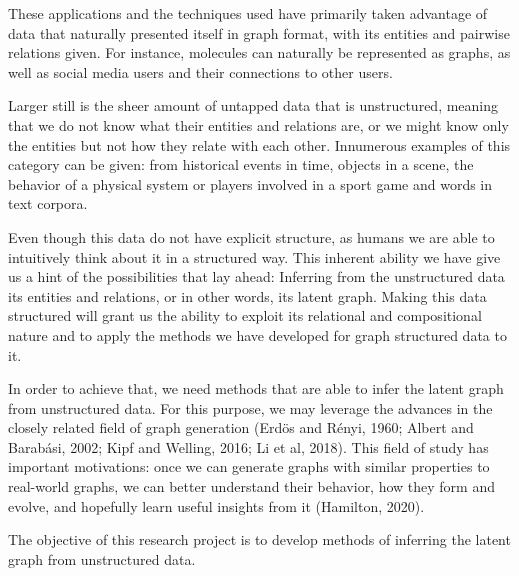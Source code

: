 These applications and the techniques used have primarily taken advantage of data that naturally presented itself in graph format, with its entities and pairwise relations given. For instance, molecules can naturally be represented as graphs, as well as social media users and their connections to other users.

Larger still is the sheer amount of untapped data that is unstructured, meaning that we do not know what their entities and relations are, or we might know only the entities but not how they relate with each other. Innumerous examples of this category can be given: from historical events in time, objects in a scene, the behavior of a physical system or players involved in a sport game and words in text corpora. 

Even though this data do not have explicit structure, as humans we are able to intuitively think about it in a structured way. This inherent ability we have give us a hint of the possibilities that lay ahead: Inferring from the unstructured data its entities and relations, or in other words, its latent graph. Making this data structured will grant us the ability to exploit its relational and compositional nature and to apply the methods we have developed for graph structured data to it.

In order to achieve that, we need methods that are able to infer the latent graph from unstructured data. For this purpose, we may leverage the advances in the closely related field of graph generation (Erdös and Rényi, 1960; Albert and Barabási, 2002; Kipf and Welling, 2016; Li et al, 2018). This field of study has important motivations: once we can generate graphs with similar properties to real-world graphs, we can better understand their behavior, how they form and evolve, and hopefully learn useful insights from it (Hamilton, 2020).

The objective of this research project is to develop methods of inferring the latent graph from unstructured data.
